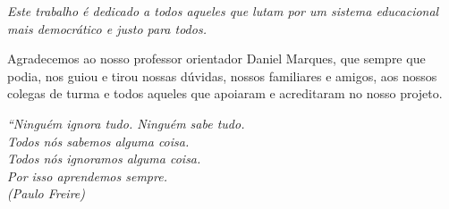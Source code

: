 \documentclass[
    12pt,               %
    openright,          %
    oneside,
    a4paper,            %
    english,            %
    brazil              %
    ]{ifsp-spo-inf-ctds} %
\begin{document}
\pretextual

\imprimircapa

\imprimirfolhaderosto

\begin{dedicatoria}
   \vspace*{\fill}
   \centering
   \noindent
   \textit{ Este trabalho é dedicado a todos aqueles que lutam por um sistema educacional mais democrático e justo para todos.} 

   
   \vspace*{\fill}
   

\end{dedicatoria}

\begin{agradecimentos}
Agradecemos ao nosso professor orientador Daniel Marques, que sempre que podia, nos guiou e tirou nossas dúvidas, nossos familiares e amigos, aos nossos colegas de turma e todos aqueles que apoiaram e acreditaram no nosso projeto.


\end{agradecimentos}

\begin{epigrafe}
    \vspace*{\fill}
    \begin{flushright}
        \textit{``Ninguém ignora tudo. Ninguém sabe tudo. \\
        Todos nós sabemos alguma coisa. \\
        Todos nós ignoramos alguma coisa.\\
        Por isso aprendemos sempre. \\
        (Paulo Freire)}
    \end{flushright}
\end{epigrafe}
\end{document}
